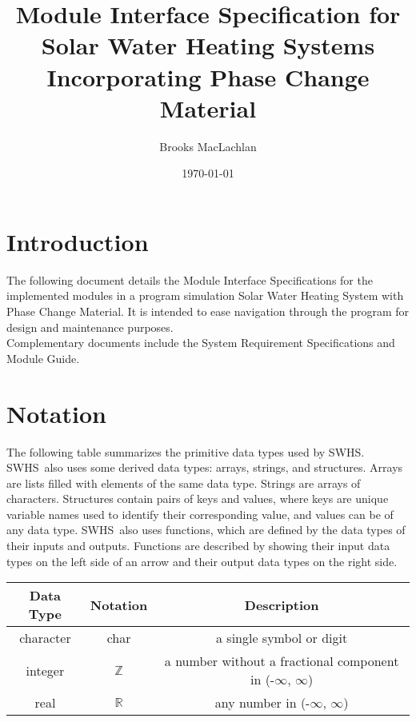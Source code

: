 \documentclass[12pt]{article}
\newcommand{\progname}{SWHS}
\begin{document}
\title{Module Interface Specification for Solar Water Heating Systems Incorporating Phase Change Material}
\author{Brooks MacLachlan}
\date{\today}

\maketitle

\tableofcontents

\section{Introduction}

The following document details the Module Interface Specifications for the implemented 
modules in a program simulation Solar Water Heating System with Phase Change Material.
It is intended to ease navigation through the program for design and maintenance purposes.\\
Complementary documents include the System Requirement Specifications and Module Guide. 

\section{Notation}

The following table summarizes the primitive data types used by \progname. \progname \ also uses some derived data types: arrays, strings, and structures. Arrays are lists filled with elements of the same data type. Strings are arrays of characters. Structures contain pairs of keys and values, where keys are unique variable names used to identify their corresponding value, and values can be of any data type. \progname \ also uses functions, which are defined by the data types of their inputs and outputs. Functions are described by showing their input data types on the left side of an arrow and their output data types on the right side.

\begin{center}
\renewcommand{\arraystretch}{1.2}
\noindent 
\begin{tabular}{c c c} 
\toprule 
\textbf{Data Type} & \textbf{Notation} & \textbf{Description}\\ 
\midrule
character & char & a single symbol or digit\\
integer & $\mathbb{Z}$ & a number without a fractional component in (-$\infty$, $\infty$) \\
real & $\mathbb{R}$ & any number in (-$\infty$, $\infty$)\\
\bottomrule
\end{tabular} 
\end{center}
\end{document}
